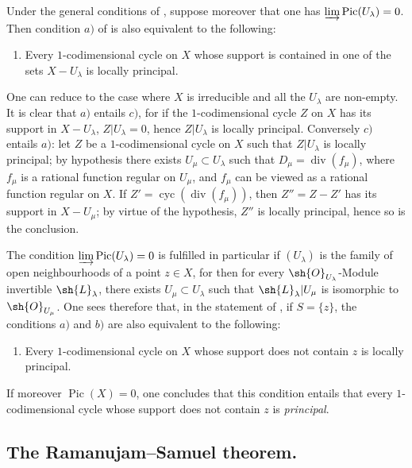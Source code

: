 \begin{remark}[21.13.16]
\label{IV.21.13.16}
Under the general conditions of , suppose moreover that one has $\varinjlim\operatorname{Pic}(U_\lambda)=0$.
Then condition $a)$ of  is also equivalent to the following:
\begin{enumerate}
  \item[c)] Every $1$-codimensional cycle on $X$ whose support is contained in one of the sets $X-U_\lambda$ is locally principal.
\end{enumerate}
One can reduce to the case where $X$ is irreducible and all the $U_\lambda$ are non-empty.
It is clear that $a)$ entails $c)$, for if the $1$-codimensional cycle $Z$ on $X$ has its support in $X-U_\lambda$, $Z|U_\lambda=0$, hence $Z|U_\lambda$ is locally principal.
Conversely $c)$ entails $a)$: let $Z$ be a $1$-codimensional cycle on $X$ such that $Z|U_\lambda$ is locally principal; by hypothesis there exists $U_\mu\subset U_\lambda$ such that $D_\mu=\operatorname{div}(f_\mu)$, where $f_\mu$ is a rational function regular on $U_\mu$, and $f_\mu$ can be viewed as a rational function regular on $X$.
If $Z'=\operatorname{cyc}(\operatorname{div}(f_\mu))$, then $Z''=Z-Z'$ has its support in $X-U_\mu$; by virtue of the hypothesis, $Z''$ is locally principal, hence so is the conclusion.

The condition $\varinjlim\operatorname{Pic}(U_\lambda)=0$ is fulfilled in particular if $(U_\lambda)$ is the family of open neighbourhoods of a point $z\in X$, for then for every $\sh{O}_{U_\lambda}$-Module invertible $\sh{L}_\lambda$, there exists $U_\mu\subset U_\lambda$ such that $\sh{L}_\lambda|U_\mu$ is isomorphic to $\sh{O}_{U_\mu}$.
One sees therefore that, in the statement of , if $S=\{z\}$, the conditions $a)$ and $b)$ are also equivalent to the following:
\begin{enumerate}
  \item[c)] Every $1$-codimensional cycle on $X$ whose support does not contain $z$ is locally principal.
\end{enumerate}
If moreover $\operatorname{Pic}(X)=0$, one concludes that this condition entails that every $1$-codimensional cycle whose support does not contain $z$ is \emph{principal}.
\end{remark}

\subsection{The Ramanujam--Samuel theorem.}
\label{subsection:IV.21.14}

